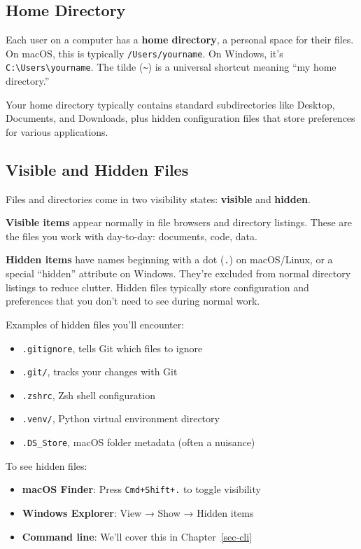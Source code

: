 \documentclass[
  letterpaper,
  DIV=11,
  numbers=noendperiod]{scrreprt}
\providecommand{\tightlist}{%
  \setlength{\itemsep}{0pt}\setlength{\parskip}{0pt}}
\begin{document}
\subsection{Home Directory}\label{home-directory}

Each user on a computer has a \textbf{home directory}, a personal space
for their files. On macOS, this is typically \texttt{/Users/yourname}.
On Windows, it's
\texttt{C:\textbackslash{}Users\textbackslash{}yourname}. The tilde
(\texttt{\textasciitilde{}}) is a universal shortcut meaning ``my home
directory.''

Your home directory typically contains standard subdirectories like
Desktop, Documents, and Downloads, plus hidden configuration files that
store preferences for various applications.

\subsection{Visible and Hidden Files}\label{visible-and-hidden-files}

Files and directories come in two visibility states: \textbf{visible}
and \textbf{hidden}.

\textbf{Visible items} appear normally in file browsers and directory
listings. These are the files you work with day-to-day: documents, code,
data.

\textbf{Hidden items} have names beginning with a dot (\texttt{.}) on
macOS/Linux, or a special ``hidden'' attribute on Windows. They're
excluded from normal directory listings to reduce clutter. Hidden files
typically store configuration and preferences that you don't need to see
during normal work.

Examples of hidden files you'll encounter:

\begin{itemize}
\tightlist
\item
  \texttt{.gitignore}, tells Git which files to ignore
\item
  \texttt{.git/}, tracks your changes with Git
\item
  \texttt{.zshrc}, Zsh shell configuration
\item
  \texttt{.venv/}, Python virtual environment directory
\item
  \texttt{.DS\_Store}, macOS folder metadata (often a nuisance)
\end{itemize}

To see hidden files:

\begin{itemize}
\tightlist
\item
  \textbf{macOS Finder}: Press \texttt{Cmd+Shift+.} to toggle visibility
\item
  \textbf{Windows Explorer}: View → Show → Hidden items
\item
  \textbf{Command line}: We'll cover this in Chapter~\ref{sec-cli}
\end{itemize}
\end{document}
